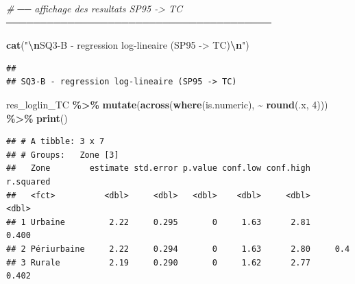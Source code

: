 \documentclass[
]{article}
\newenvironment{Shaded}{\begin{snugshade}}{\end{snugshade}}
\newcommand{\CommentTok}[1]{\textcolor[rgb]{0.56,0.35,0.01}{\textit{#1}}}
\newcommand{\DecValTok}[1]{\textcolor[rgb]{0.00,0.00,0.81}{#1}}
\newcommand{\FunctionTok}[1]{\textcolor[rgb]{0.13,0.29,0.53}{\textbf{#1}}}
\newcommand{\NormalTok}[1]{#1}
\newcommand{\SpecialCharTok}[1]{\textcolor[rgb]{0.81,0.36,0.00}{\textbf{#1}}}
\newcommand{\StringTok}[1]{\textcolor[rgb]{0.31,0.60,0.02}{#1}}
\begin{document}
\begin{Shaded}
\begin{Highlighting}[]
\CommentTok{\# ── affichage des resultats SP95 {-}\textgreater{} TC ───────────────────────────────────────}

\FunctionTok{cat}\NormalTok{(}\StringTok{"}\SpecialCharTok{\textbackslash{}n}\StringTok{SQ3{-}B {-} regression log{-}lineaire (SP95 {-}\textgreater{} TC)}\SpecialCharTok{\textbackslash{}n}\StringTok{"}\NormalTok{)}
\end{Highlighting}
\end{Shaded}

\begin{verbatim}
## 
## SQ3-B - regression log-lineaire (SP95 -> TC)
\end{verbatim}

\begin{Shaded}
\begin{Highlighting}[]
\NormalTok{res\_loglin\_TC }\SpecialCharTok{\%\textgreater{}\%}
  \FunctionTok{mutate}\NormalTok{(}\FunctionTok{across}\NormalTok{(}\FunctionTok{where}\NormalTok{(is.numeric), }\SpecialCharTok{\textasciitilde{}} \FunctionTok{round}\NormalTok{(.x, }\DecValTok{4}\NormalTok{))) }\SpecialCharTok{\%\textgreater{}\%}
  \FunctionTok{print}\NormalTok{()}
\end{Highlighting}
\end{Shaded}

\begin{verbatim}
## # A tibble: 3 x 7
## # Groups:   Zone [3]
##   Zone        estimate std.error p.value conf.low conf.high r.squared
##   <fct>          <dbl>     <dbl>   <dbl>    <dbl>     <dbl>     <dbl>
## 1 Urbaine         2.22     0.295       0     1.63      2.81     0.400
## 2 Périurbaine     2.22     0.294       0     1.63      2.80     0.4  
## 3 Rurale          2.19     0.290       0     1.62      2.77     0.402
\end{verbatim}
\end{document}
